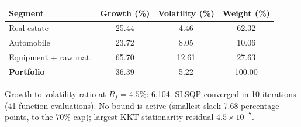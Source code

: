 \begin{tabular}{lccc}
\toprule
\textbf{Segment} & \textbf{Growth (\%)} & \textbf{Volatility (\%)} & \textbf{Weight (\%)} \\
\midrule
Real estate & 25.44 & 4.46 & 62.32 \\
Automobile & 23.72 & 8.05 & 10.06 \\
Equipment + raw mat. & 65.70 & 12.61 & 27.63 \\
\textbf{Portfolio} & 36.39 & 5.22 & 100.00 \\
\bottomrule
\end{tabular}
\par\smallskip\parbox{\linewidth}{\footnotesize Growth-to-volatility ratio at $R_f = 4.5\%$: 6.104. SLSQP converged in 10 iterations (41 function evaluations). No bound is active (smallest slack 7.68 percentage points, to the 70\% cap); largest KKT stationarity residual $4.5\times 10^{-7}$.}
